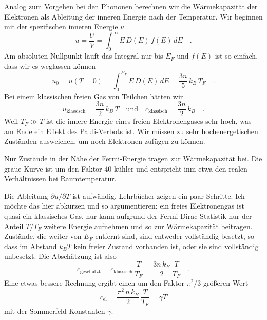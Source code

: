 Analog zum Vorgehen bei den Phononen berechnen wir die Wärmekapazität der Elektronen als Ableitung der inneren Energie nach der Temperatur. Wir beginnen mit der spezifischen inneren Energie $u$
\begin{equation}
    u = \frac{U}{V} = \int_0^\infty E \, D(E) \, f(E) \,  dE \quad .
\end{equation}
Am absoluten Nullpunkt läuft das Integral nur bis $E_F$ und $f(E)$ ist so einfach, dass wir es weglassen können
\begin{equation}
    u_0 = u(T=0) = \int_0^{E_F} E \, D(E) \, dE = \frac{3n}{5} \, k_B \, T_F \quad .
\end{equation}
Bei einem klassischen freien Gas von Teilchen hätten wir 
\begin{equation}
    u_\text{klassisch} = \frac{3 n}{2} \, k_B \, T \quad \text{und} \quad c_\text{klassisch} = \frac{3 n}{2} \, k_B  \quad .
\end{equation}
Weil $T_F \gg T$ ist die innere Energie eines freien Elektronengases sehr hoch, was am Ende ein Effekt des Pauli-Verbots ist. Wir müssen zu sehr hochenergetischen Zuständen ausweichen, um noch Elektronen zufügen zu können.

\begin{marginfigure}
    \caption{Nur Zustände in der Nähe der Fermi-Energie tragen zur Wärmekapazität bei. Die graue Kurve ist um den Faktor 40 kühler und entspricht inm etwa den realen Verhältnissen bei Raumtemperatur.}
    \label{fig:2_fermi_dirac_T}
\end{marginfigure}


Die Ableitung $\partial u / \partial T$ ist aufwändig. Lehrbücher zeigen ein paar Schritte. Ich möchte das hier abkürzen und so argumentieren: ein freies Elektronengas ist quasi ein klassisches Gas, nur kann aufgrund der Fermi-Dirac-Statistik nur der Anteil $T/T_F$ weitere Energie aufnehmen und so zur Wärmekapazität beitragen. Zustände, die weiter von $E_F$ entfernt sind, sind entweder vollständig besetzt, so dass im Abstand $k_B T$ kein freier Zustand vorhanden ist, oder sie sind vollständig unbesetzt. Die Abschätzung ist also
\begin{equation}
    c_\text{geschätzt} = c_\text{klassisch}  \, \frac{T}{T_F} = \frac{3 n \, k_B}{2}  \, \frac{T}{T_F} \quad .
\end{equation}
Eine etwas bessere Rechnung ergibt einen um den Faktor $\pi^2/3$ größeren Wert
\begin{equation}
    c_\text{el} = \frac{\pi^2 \, n \, k_B}{2}  \, \frac{T}{T_F} = \gamma T \label{eq:2_WK_elek}
\end{equation}
mit der Sommerfeld-Konstanten $\gamma$.


